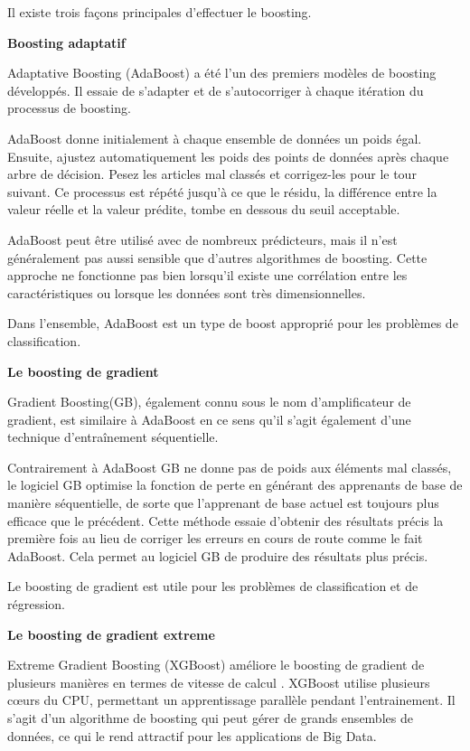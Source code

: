 \documentclass[french,a4paper,12pt]{article}
\begin{document}
\quad Il existe trois façons principales d’effectuer le boosting.

\textbf{Boosting adaptatif }

\quad Adaptative Boosting (AdaBoost) a été l'un des premiers modèles de boosting développés. Il essaie de s'adapter et de s'autocorriger à chaque itération du processus de boosting.


\quad AdaBoost donne initialement à chaque ensemble de données un poids égal. Ensuite, ajustez automatiquement les poids des points de données après chaque arbre de décision. Pesez les articles mal classés et corrigez-les pour le tour suivant. Ce processus est répété jusqu'à ce que le résidu, la différence entre la valeur réelle et la valeur prédite, tombe en dessous du seuil acceptable.

\quad AdaBoost peut être utilisé avec de nombreux prédicteurs, mais il n'est généralement pas aussi sensible que d'autres algorithmes de boosting. Cette approche ne fonctionne pas bien lorsqu'il existe une corrélation entre les caractéristiques ou lorsque les données sont très dimensionnelles. 

\quad Dans l'ensemble, AdaBoost est un type de boost approprié pour les problèmes de classification. 

\textbf{Le boosting de gradient}

\quad Gradient Boosting(GB), également connu sous le nom d’amplificateur de gradient, est similaire à AdaBoost en ce sens qu'il s'agit également d'une technique d'entraînement séquentielle.

\quad Contrairement à AdaBoost  GB ne donne pas de poids aux éléments mal classés,  le logiciel GB optimise la fonction de perte en générant des apprenants de base de manière séquentielle, de sorte que l'apprenant de base actuel est toujours plus efficace que le précédent. Cette méthode essaie d'obtenir des résultats précis la première fois au lieu de corriger les erreurs en cours de route comme le fait AdaBoost. Cela permet au logiciel GB de produire des résultats plus précis.

\quad Le boosting de gradient est utile pour les problèmes de classification et de régression.




\textbf{Le boosting de gradient extreme}

\quad Extreme Gradient Boosting (XGBoost) améliore le boosting  de gradient de plusieurs manières en termes de vitesse de calcul . XGBoost utilise plusieurs cœurs du CPU, permettant un apprentissage parallèle pendant l’entrainement. Il s'agit d'un algorithme de boosting qui peut gérer de grands ensembles de données, ce qui le rend attractif pour les applications de Big Data. 
\end{document}
